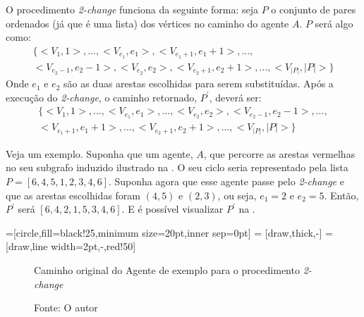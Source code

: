 O procedimento \textit{2-change} funciona da seguinte forma: seja $P$ o conjunto 
de pares ordenados (já que é uma lista) dos vértices no caminho do agente $A$. 
$P$ será algo como:
\begin{multline*}
\{<V_{1},1>,...,<V_{e_{1}},e_{1}>,<V_{e_{1}+1},e_{1}+1>,..., \\
<V_{e_{2}-1},e_{2}-1>,<V_{e_{2}},e_{2}>,<V_{e_{2}+1},e_{2}+1>,...,<V_{|P|},|P|>\}
\end{multline*}
Onde $e_{1}$ e $e_{2}$ são as duas arestas escolhidas para serem substituídas. 
Após a execução do \textit{2-change}, o caminho retornado, $P^{\prime}$, deverá 
ser:
\begin{multline*}
\{<V_{1},1>,...,<V_{e_{1}},e_{1}>,...,<V_{e_{2}},e_{2}>,<V_{e_{2}-1},e_{2}-1>,..., \\
<V_{e_{1}+1},e_{1}+1>,...,<V_{e_{2}+1},e_{2}+1>,...,<V_{|P|},|P|>\}
\end{multline*}

Veja um exemplo. Suponha que um agente, $A$, que percorre as arestas vermelhas 
no seu subgrafo induzido ilustrado na . O seu ciclo seria 
representado pela lista $P = [6,4,5,1,2,3,4,6]$. Suponha agora que esse agente 
passe pelo \textit{2-change} e que as arestas escolhidas foram $(4,5)$ e $(2,3)$, 
ou seja, $e_{1} = 2$ e $e_{2} = 5$. Então, $P^{\prime}$ será 
$[6,4,2,1,5,3,4,6]$. E é possível visualizar $P^{\prime}$ na 
.

=[circle,fill=black!25,minimum size=20pt,inner sep=0pt]
 = [draw,thick,-]
 = [draw,line width=2pt,-,red!50]

\begin{figure}[h]
	\caption{Caminho original do Agente de exemplo para o procedimento \textit{2-change}}
	\centering
	\caption*{Fonte: O autor}
	\label{2_change_ex1}
\end{figure}

